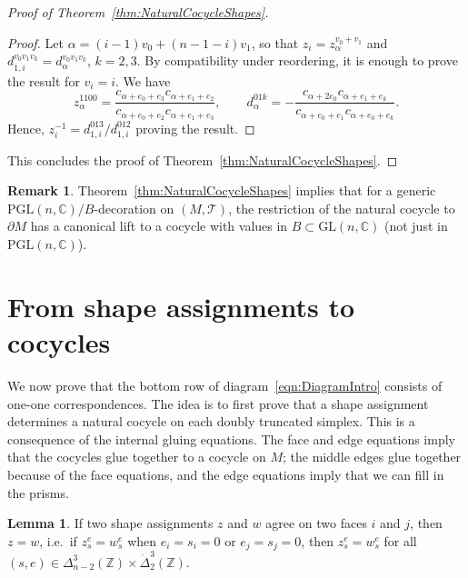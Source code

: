 \documentclass[12pt]{amsart}
\theoremstyle{definition}
\newtheorem{lemma}[theorem]{Lemma}
\newtheorem{remark}[theorem]{Remark}
\numberwithin{equation}{section}
\def\PGL{\mathrm{PGL}}
\def\GL{\mathrm{GL}}
\def\Z{\mathbb{Z}}
\def\C{\mathbb{C}}
\def\T{\mathcal{T}}
\begin{document}
\begin{proof}[Proof of Theorem~\ref{thm:NaturalCocycleShapes}]
\begin{proof}
Let $\alpha=(i-1)v_0+(n-1-i)v_1$, so that $z_i=z^{v_0+v_1}_{\alpha}$ and $d^{v_0v_1v_k}_{1,i}=d^{v_0v_1v_k}_\alpha$, $k=2,3$. By compatibility under reordering, it is enough to prove the result for $v_i=i$. We have
\begin{equation}
z^{1100}_{\alpha}=\frac{c_{\alpha+e_0+e_3}c_{\alpha+e_1+e_2}}{c_{\alpha+e_0+e_2}c_{\alpha+e_1+e_3}},\qquad d^{01k}_\alpha=-\frac{c_{\alpha+2e_0}c_{\alpha+e_1+e_k}}{c_{\alpha+e_0+e_1}c_{\alpha+e_0+e_k}}.
\end{equation}
Hence, $z_i^{-1}=d^{013}_{1,i}/d^{012}_{1,i}$ proving the result.
\end{proof}
This concludes the proof of Theorem~\ref{thm:NaturalCocycleShapes}.
\end{proof}

\begin{remark}\label{rm:NaturalLift}
Theorem~\ref{thm:NaturalCocycleShapes} implies that for a generic $\PGL(n,\C)/B$-decoration on $(M,\T)$, the restriction of the natural cocycle to $\partial M$ has a canonical lift to a cocycle with values in $B\subset\GL(n,\C)$ (not just in $\PGL(n,\C)$).
\end{remark}

\section{From shape assignments to cocycles}\label{sec:ReconstructRep}

We now prove that the bottom row of diagram~\eqref{eqn:DiagramIntro} consists of one-one correspondences.
The idea is to first prove that a shape assignment determines a natural cocycle on each doubly truncated simplex. This is a consequence of the internal gluing equations. The face and edge equations imply that the cocycles glue together to a cocycle on $M$; the middle edges glue together because of the face equations, and the edge equations imply that we can fill in the prisms.

\begin{lemma}\label{lemma:AgreeonFaces}
If two shape assignments $z$ and $w$ agree on two faces $i$ and $j$, then $z=w$, i.e.~if $z_s^e=w_s^e$ when $e_i=s_i=0$ or $e_j=s_j=0$, then $z_s^e=w_s^e$ for all $(s,e)\in\Delta^3_{n-2}(\Z)\times\dot\Delta^3_2(\Z)$.
\end{lemma}
\end{document}

